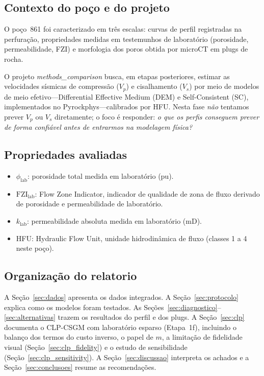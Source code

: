 \documentclass[11pt,a4paper]{article}
\newcommand{\philab}{\ensuremath{\phi_{\mathrm{lab}}}}
\newcommand{\fzilab}{\ensuremath{\mathrm{FZI}_{\mathrm{lab}}}}
\newcommand{\klab}{\ensuremath{k_{\mathrm{lab}}}}
\begin{document}
\subsection{Contexto do poço e do projeto}

O poço~861 foi caracterizado em três escalas: curvas de perfil
registradas na perfuração, propriedades medidas em testemunhos de
laboratório (porosidade, permeabilidade, FZI) e morfologia dos poros
obtida por microCT em plugs de rocha.

O projeto \emph{methods\_comparison} busca, em etapas posteriores, estimar
as velocidades sísmicas de compressão ($V_p$) e cisalhamento ($V_s$)
por meio de modelos de meio efetivo---Differential Effective Medium (DEM)
e Self-Consistent (SC), implementados no Pyrockphys---calibrados por HFU.
Nesta fase \emph{não} tentamos prever $V_p$ ou $V_s$ diretamente; o foco
é responder: \emph{o que os perfis conseguem prever de forma confiável
antes de entrarmos na modelagem física?}

\subsection{Propriedades avaliadas}

\begin{itemize}
  \item \philab: porosidade total medida em laboratório (pu).
  \item \fzilab: Flow Zone Indicator, indicador de qualidade de
        zona de fluxo derivado de porosidade e permeabilidade de laboratório.
  \item \klab: permeabilidade absoluta medida em laboratório (mD).
  \item HFU: Hydraulic Flow Unit, unidade hidrodinâmica de fluxo
        (classes 1 a 4 neste poço).
\end{itemize}

\subsection{Organização do relatorio}

A Seção~\ref{sec:dados} apresenta os dados integrados.
A Seção~\ref{sec:protocolo} explica como os modelos foram testados.
As Seções~\ref{sec:diagnostico}--\ref{sec:alternativas} trazem os
resultados do perfil e dos plugs.
A Seção~\ref{sec:clp} documenta o CLP-CSGM com laboratório esparso
(Etapa~1f), incluindo o balanço dos termos do custo inverso, o papel
de $m$, a limitação de fidelidade visual (Seção~\ref{sec:clp_fidelity})
e o estudo de sensibilidade (Seção~\ref{sec:clp_sensitivity}).
A Seção~\ref{sec:discussao} interpreta os achados e a
Seção~\ref{sec:conclusoes} resume as recomendações.
\end{document}
